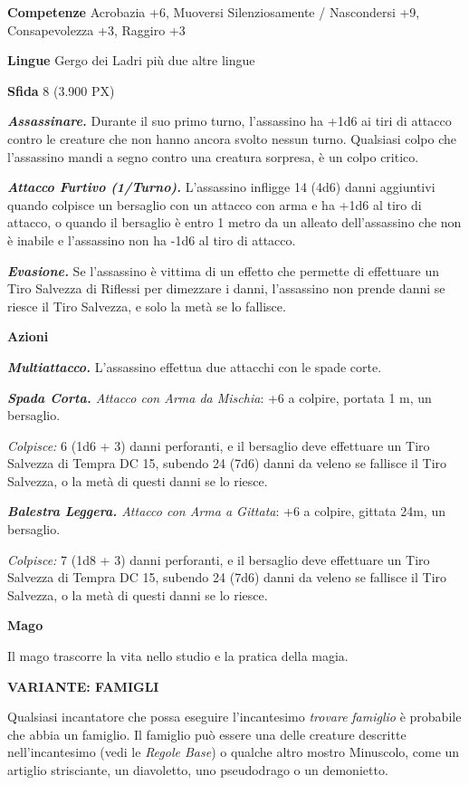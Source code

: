 \begin{multicols}{2}
\textbf{Competenze} Acrobazia +6, Muoversi Silenziosamente / Nascondersi +9, Consapevolezza +3, Raggiro +3


\textbf{Lingue} Gergo dei Ladri più due altre lingue

\textbf{Sfida} 8 (3.900 PX)

\textit{\textbf{Assassinare.}} Durante il suo primo turno, l'assassino ha +1d6 ai tiri di attacco contro le creature che non hanno ancora svolto nessun turno. Qualsiasi colpo che l'assassino mandi a segno contro una creatura sorpresa, è un colpo critico.

\textit{\textbf{Attacco Furtivo (1/Turno).}} L'assassino infligge 14 (4d6) danni aggiuntivi quando colpisce un bersaglio con un attacco con arma e ha +1d6 al tiro di attacco, o quando il bersaglio è entro 1 metro da un alleato dell'assassino che non è inabile e l'assassino non ha -1d6 al tiro di attacco.

\textit{\textbf{Evasione.}} Se l'assassino è vittima di un effetto che permette di effettuare un Tiro Salvezza di Riflessi per dimezzare i danni, l'assassino non prende danni se riesce il Tiro Salvezza, e solo la metà se lo fallisce.

\textbf{Azioni}

\textit{\textbf{Multiattacco.}} L'assassino effettua due attacchi con le spade corte.

\textit{\textbf{Spada Corta.} Attacco con Arma da Mischia}: +6 a colpire, portata 1 m, un bersaglio.

\textit{Colpisce:} 6 (1d6 + 3) danni perforanti, e il bersaglio deve effettuare un Tiro Salvezza di Tempra DC 15, subendo 24 (7d6) danni da veleno se fallisce il Tiro Salvezza, o la metà di questi danni se lo riesce.

\textit{\textbf{Balestra Leggera.} Attacco con Arma a Gittata}: +6 a colpire, gittata 24m, un bersaglio.

\textit{Colpisce:} 7 (1d8 + 3) danni perforanti, e il bersaglio deve effettuare un Tiro Salvezza di Tempra DC 15, subendo 24 (7d6) danni da veleno se fallisce il Tiro Salvezza, o la metà di questi danni se lo riesce.

\medskip\textbf{Mago}

Il mago trascorre la vita nello studio e la pratica della magia.

\textbf{VARIANTE: FAMIGLI}

Qualsiasi incantatore che possa eseguire l'incantesimo \textit{trovare} \textit{famiglio} è probabile che abbia un famiglio. Il famiglio può essere una delle creature descritte nell'incantesimo (vedi le \textit{Regole Base}) o qualche altro mostro Minuscolo, come un artiglio strisciante, un diavoletto, uno pseudodrago o un demonietto.


\end{multicols}
